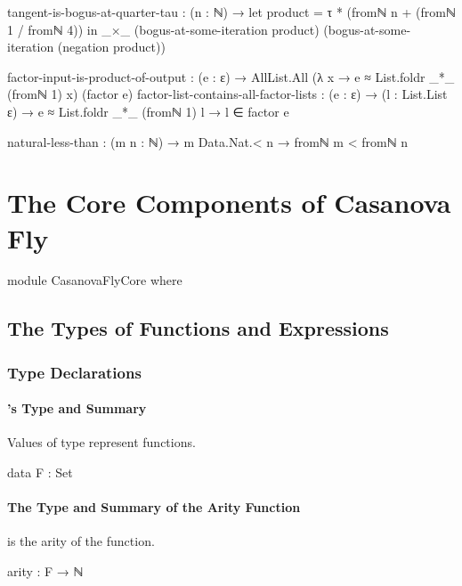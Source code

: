 \documentclass{report}
\begin{document}
\begin{code}
    tangent-is-bogus-at-quarter-tau :
      (n : ℕ) →
      let product = τ * (fromℕ n + (fromℕ 1 / fromℕ 4)) in
      _×_ (bogus-at-some-iteration product)
          (bogus-at-some-iteration (negation product))

    factor-input-is-product-of-output :
      (e : ε) →
      AllList.All (λ x → e ≈ List.foldr _*_ (fromℕ 1) x) (factor e)
    factor-list-contains-all-factor-lists :
      (e : ε) →
      (l : List.List ε) →
      e ≈ List.foldr _*_ (fromℕ 1) l →
      l ∈ factor e

    natural-less-than : (m n : ℕ) → m Data.Nat.< n → fromℕ m < fromℕ n
\end{code}

\part{The Core Components of Casanova Fly}\label{sec:casanovaFlyCore}

\begin{code}
module CasanovaFlyCore where
\end{code}

\chapter{The Types of Functions and Expressions}

\section{Type Declarations}

\subsection{'s Type and Summary}
Values of type  represent functions.

\begin{code}
  data F : Set
\end{code}

\subsection{The Type and Summary of the Arity Function}
  is the arity of the  function.

\begin{code}
  arity : F → ℕ
\end{code}
\end{document}

